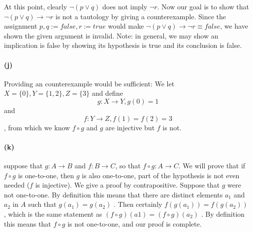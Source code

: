 \documentclass[a4paper]{article}
\renewcommand{\implies}{\rightarrow}
\begin{document}
\noindent At this point, clearly $\neg (p \vee q)$ does not imply $\neg r$. Now our goal is to show that $\neg (p \vee q) \implies \neg r$ is not a tautology by giving a counterexample. Since the assignment $p,q := false, r := true$ would make $\neg (p \vee q) \implies \neg r \equiv false$, we have shown the given argument is invalid. Note: in general, we may show an implication is false by showing its hypothesis is true and its conclusion is false. 

\paragraph{(j)} Providing an counterexample would be sufficient: We let $X = \{0\}, Y = \{1,2\}, Z = \{3\}$ and define $$g: X \to Y, g(0) = 1$$ and $$f: Y \to Z, f(1) = f(2) = 3$$,
 from which we know $f \circ g$ and $g$ are injective but $f$ is not. 

 \paragraph{(k)} suppose that $g : A \to B$ and $f : B \to C$, so that $f \circ g : A \to C$. We will prove that if
$f \circ g$ is one-to-one, then $g$ is also one-to-one, part of the hypothesis is not even needed ($f$ is injective). We give a proof by contrapositive. Suppose that $g$ were not one-to-one. By definition this means that there are distinct elements $a_1$ and $a_2$ in $A$ such that $g(a_1) = g(a_2)$ . Then certainly $f(g(a_1)) = f(g(a_2))$ , which is the same statement as $(f \circ g)(a1) = (f \circ g)(a_2)$ . By definition this means that $f \circ g$ is not one-to-one, and our proof is complete.
\end{document}
